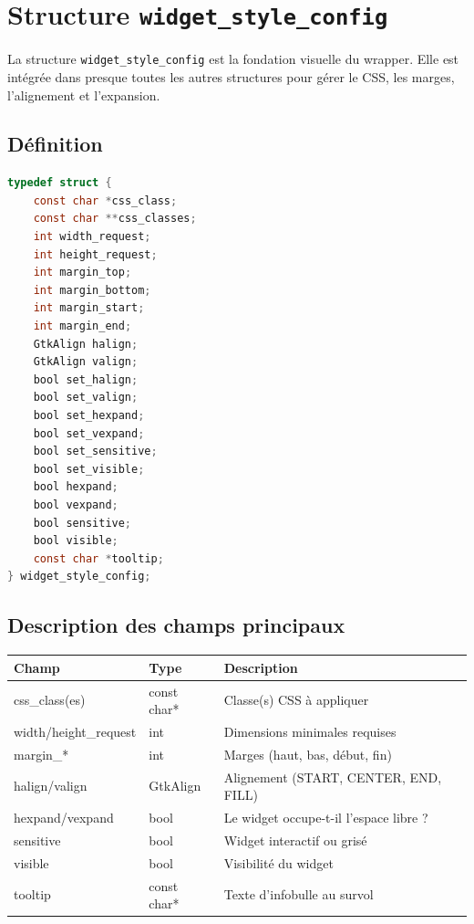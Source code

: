 \section{Structure \texttt{widget\_style\_config}}

La structure \texttt{widget\_style\_config} est la fondation visuelle du wrapper. Elle est intégrée dans presque toutes les autres structures pour gérer le CSS, les marges, l'alignement et l'expansion.

\subsection{Définition}

\begin{lstlisting}[language=C]
typedef struct {
    const char *css_class;
    const char **css_classes;
    int width_request;
    int height_request;
    int margin_top;
    int margin_bottom;
    int margin_start;
    int margin_end;
    GtkAlign halign;
    GtkAlign valign;
    bool set_halign;
    bool set_valign;
    bool set_hexpand;
    bool set_vexpand;
    bool set_sensitive;
    bool set_visible;
    bool hexpand;
    bool vexpand;
    bool sensitive;
    bool visible;
    const char *tooltip;
} widget_style_config;
\end{lstlisting}

\subsection{Description des champs principaux}

\begin{center}
\begin{tabular}{|l|l|>{\raggedright\arraybackslash}p{6cm}|}
\hline
\textbf{Champ} & \textbf{Type} & \textbf{Description} \\
\hline
css\_class(es) & const char* & Classe(s) CSS à appliquer \\
\hline
width/height\_request & int & Dimensions minimales requises \\
\hline
margin\_* & int & Marges (haut, bas, début, fin) \\
\hline
halign/valign & GtkAlign & Alignement (START, CENTER, END, FILL) \\
\hline
hexpand/vexpand & bool & Le widget occupe-t-il l'espace libre ? \\
\hline
sensitive & bool & Widget interactif ou grisé \\
\hline
visible & bool & Visibilité du widget \\
\hline
tooltip & const char* & Texte d'infobulle au survol \\
\hline
\end{tabular}
\end{center}

